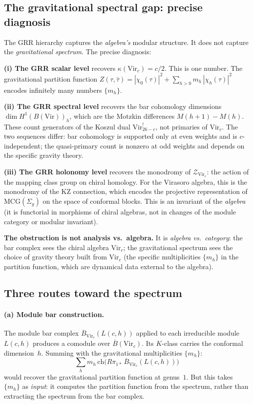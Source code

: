 \documentclass[11pt]{article}
\newcommand{\cZ}{\mathcal{Z}}
\newcommand{\barB}{\overline{B}}
\begin{document}
\subsection{The gravitational spectral gap: precise diagnosis}

The GRR hierarchy captures the \emph{algebra's} modular
structure.  It does not capture the \emph{gravitational
spectrum}.  The precise diagnosis:

\textbf{(i) The GRR scalar level} recovers $\kappa(\mathrm{Vir}_c)
= c/2$.  This is one number.  The gravitational partition function
$Z(\tau,\bar\tau) = |\chi_0(\tau)|^2 + \sum_{h > 0} m_h\,
|\chi_h(\tau)|^2$ encodes infinitely many numbers $\{m_h\}$.

\textbf{(ii) The GRR spectral level} recovers the bar cohomology
dimensions $\dim H^1(B(\mathrm{Vir}))_h$, which are the Motzkin
differences $M(h+1) - M(h)$.  These count generators of the
Koszul dual $\mathrm{Vir}^!_{26-c}$, not primaries of
$\mathrm{Vir}_c$.  The two sequences differ: bar cohomology is
supported only at even weights and is $c$-independent; the
quasi-primary count is nonzero at odd weights and depends on the
specific gravity theory.

\textbf{(iii) The GRR holonomy level} recovers the monodromy of
$\cZ_{\mathrm{Vir}_c}$: the action of the mapping class group on
chiral homology.  For the Virasoro algebra, this is the
monodromy of the KZ connection, which encodes the
projective representation of $\mathrm{MCG}(\Sigma_g)$ on the
space of conformal blocks.  This is an invariant of the
\emph{algebra} (it is functorial in morphisms of chiral algebras,
not in changes of the module category or modular invariant).

\textbf{The obstruction is not analysis vs.\ algebra.}
It is \emph{algebra vs.\ category}: the bar complex sees
the chiral algebra $\mathrm{Vir}_c$; the gravitational
spectrum sees the choice of gravity theory built from
$\mathrm{Vir}_c$ (the specific multiplicities $\{m_h\}$
in the partition function, which are dynamical data external
to the algebra).

\subsection{Three routes toward the spectrum}

\paragraph{(a) Module bar construction.}
The module bar complex $\barB_{\mathrm{Vir}_c}(L(c,h))$ applied
to each irreducible module $L(c,h)$ produces a comodule over
$\barB(\mathrm{Vir}_c)$.  Its $K$-class carries the conformal
dimension~$h$.  Summing with the gravitational multiplicities
$\{m_h\}$:
\[
\sum_{h} m_h\,\mathrm{ch}\bigl(
R\pi_{1*}\,\barB_{\mathrm{Vir}_c}(L(c,h))\bigr)
\]
would recover the gravitational partition function at genus~$1$.
But this takes $\{m_h\}$ as \emph{input}: it computes the
partition function from the spectrum, rather than extracting
the spectrum from the bar complex.
\end{document}
